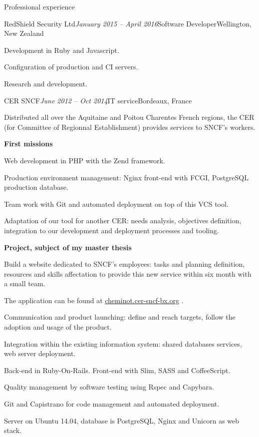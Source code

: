 \begin{rSection}{Professional experience}

  \begin{rSubsection}{RedShield Security Ltd}{\em January 2015 -- April 2016}{Software Developer}{Wellington, New Zealand}
    \item[] Development in Ruby and Javascript.
    \item[] Configuration of production and CI servers.
    \item[] Research and development.
  \end{rSubsection}



  \begin{rSubsection}{CER SNCF}{\em June 2012 -- Oct 2014}{IT service}{Bordeaux, France}
    \item[] Distributed all over the Aquitaine and Poitou Charentes French regions, the CER (for Committee of Regionnal Establishment) provides services to SNCF's workers.

    \textbf{First missions}
      \item Web development in PHP with the Zend framework.
      \item Production environment management: Nginx front-end with FCGI, PostgreSQL production database.
      \item Team work with Git and automated deployment on top of this VCS tool.
      \item Adaptation of our tool for another CER: needs analysis, objectives definition, integration to our development and deployment processes and tooling.

    \textbf{Project, subject of my master thesis}
      \item Build a website dedicated to SNCF's employees: tasks and planning definition, resources and skills affectation to provide this new service within six month with a small team.
      \item The application can be found at \href{http://cheminot.cer-sncf-bx.org}{cheminot.cer-sncf-bx.org} .
      \item Communication and product launching: define and reach targets, follow the adoption and usage of the product.
      \item Integration within the existing information system: shared databases services, web server deployment.
      \item Back-end in Ruby-On-Rails. Front-end with Slim, SASS and CoffeeScript.
      \item Quality management by software testing using Rspec and Capybara.
      \item Git and Capistrano for code management and automated deployment.
      \item Server on Ubuntu 14.04, database is PostgreSQL, Nginx and Unicorn as web stack.


\end{rSubsection}
\end{rSection}
